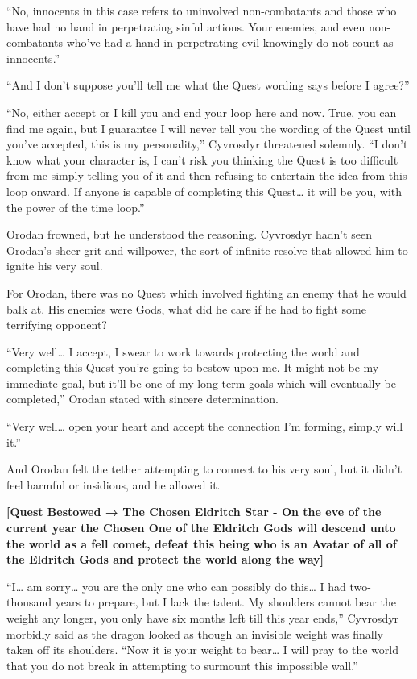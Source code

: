\documentclass[a4paper,10pt]{book}
\begin{document}
“No, innocents in this case refers to uninvolved non-combatants and those who have had no hand in perpetrating sinful actions. Your enemies, and even non-combatants who’ve had a hand in perpetrating evil knowingly do not count as innocents.”\par
“And I don’t suppose you’ll tell me what the Quest wording says before I agree?”\par
“No, either accept or I kill you and end your loop here and now. True, you can find me again, but I guarantee I will never tell you the wording of the Quest until you’ve accepted, this is my personality,” Cyvrosdyr threatened solemnly. “I don’t know what your character is, I can’t risk you thinking the Quest is too difficult from me simply telling you of it and then refusing to entertain the idea from this loop onward. If anyone is capable of completing this Quest… it will be you, with the power of the time loop.”\par
Orodan frowned, but he understood the reasoning. Cyvrosdyr hadn’t seen Orodan’s sheer grit and willpower, the sort of infinite resolve that allowed him to ignite his very soul.\par
For Orodan, there was no Quest which involved fighting an enemy that he would balk at. His enemies were Gods, what did he care if he had to fight some terrifying opponent?\par
“Very well… I accept, I swear to work towards protecting the world and completing this Quest you’re going to bestow upon me. It might not be my immediate goal, but it’ll be one of my long term goals which will eventually be completed,” Orodan stated with sincere determination.\par
“Very well… open your heart and accept the connection I’m forming, simply will it.”\par
And Orodan felt the tether attempting to connect to his very soul, but it didn’t feel harmful or insidious, and he allowed it.\par
\textbf{[Quest Bestowed → The Chosen Eldritch Star - On the eve of the current year the Chosen One of the Eldritch Gods will descend unto the world as a fell comet, defeat this being who is an Avatar of all of the Eldritch Gods and protect the world along the way]}\par
“I… am sorry… you are the only one who can possibly do this… I had two-thousand years to prepare, but I lack the talent. My shoulders cannot bear the weight any longer, you only have six months left till this year ends,” Cyvrosdyr morbidly said as the dragon looked as though an invisible weight was finally taken off its shoulders. “Now it is your weight to bear… I will pray to the world that you do not break in attempting to surmount this impossible wall.”\par
\end{document}
